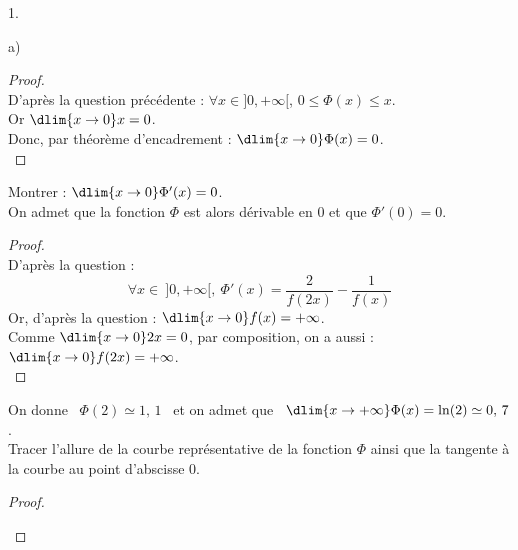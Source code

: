 \documentclass[11pt]{article}%
\begin{document}
\begin{noliste}{1.}
\begin{noliste}{a)}
    \begin{proof}~\\
      D'après la question précédente : $\forall x \in ]0,+\infty[$, 
      $0 \leq \Phi(x) \leq x$.\\
      Or $\dlim{x\to 0} x = 0$.\\
      Donc, par théorème d'encadrement : $\dlim{x\to 0} \Phi(x) =0$.
      ~\\[-1cm]
    \end{proof}

    
  \item Montrer : $\dlim{x\to 0} \Phi'(x) =0$.\\
    On admet que la fonction $\Phi$ est alors dérivable en $0$ et que
    $\Phi'(0)=0$.
    
    \begin{proof}~\\
      D'après la question  :
      \[
        \forall x \in \ ]0,+\infty[, \ \Phi'(x) = \dfrac{2}{f(2x)}
        - \dfrac{1}{f(x)}
      \]
      Or, d'après la question  : $\dlim{x\to 0} f(x) =
      +\infty$.\\
      Comme $\dlim{x\to 0} 2x =0$, par composition, on a aussi : 
      $\dlim{x\to 0} f(2x) = +\infty$.
      ~\\[-1cm]
    \end{proof}
  \end{noliste}
  
  
  
  
  \item On donne \ $\Phi(2) \simeq 1, \, 1$ \ et on admet que \ 
  $\dlim{x\to +\infty} \Phi(x) = \ln(2) \simeq 0, \, 7$.\\
  Tracer l'allure de la courbe représentative de la fonction $\Phi$ 
  ainsi que la tangente à la courbe au point d'abscisse $0$.
  
  \begin{proof}~
    \begin{center}
    

\end{center}
\end{proof}
\end{noliste}
\end{document}
